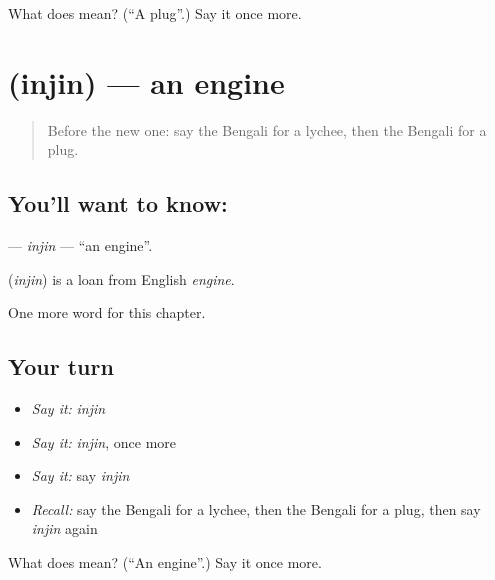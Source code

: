 \begin{tcolorbox}[breakable,colback=teal!4,colframe=teal!35!black,title={Before you move on}]
What does  mean? (\textquotedblleft{}A plug\textquotedblright{}.) Say it once more.
\end{tcolorbox}
\section[\texorpdfstring{\bn{ইঞ্জিন} (injin)}{ইঞ্জিন (injin)}]{ (injin) — an engine}

\label{lesson:BN-C174-injin}



\begin{quote}
Before the new one: say the Bengali for a lychee, then the Bengali for a plug.
\end{quote}

\subsection*{You'll want to know: }
\textbf{} — \emph{injin} — \textquotedblleft{}an engine\textquotedblright{}.

\begin{cousinweb}
\textbf{} (\emph{injin}) is a loan from English \emph{engine}.
\end{cousinweb}

\begin{grammarlens}[title={What you've built}]
One more word for this chapter.
\end{grammarlens}

\subsection*{Your turn}
\begin{itemize}
\raggedright
  \item \emph{Say it:} \emph{injin}
  \item \emph{Say it:} \emph{injin}, once more
  \item \emph{Say it:} say \emph{injin}
  \item \emph{Recall:} say the Bengali for a lychee, then the Bengali for a plug, then say \emph{injin} again
\end{itemize}

\begin{tcolorbox}[breakable,colback=teal!4,colframe=teal!35!black,title={Before you move on}]
What does  mean? (\textquotedblleft{}An engine\textquotedblright{}.) Say it once more.
\end{tcolorbox}
